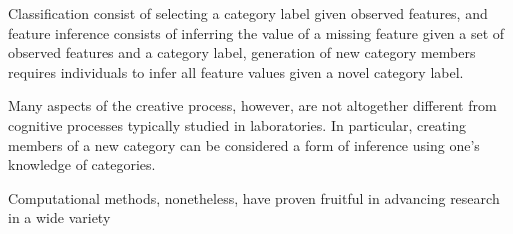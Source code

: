 \documentclass[12pt]{article}
\begin{document}
\begin{flushleft}
Classification consist of selecting a category label given observed features, and feature inference consists of inferring the value of a missing feature given a set of observed features and a category label, generation of new category members requires individuals to infer all feature values given a novel category label.


Many aspects of the creative process, however, are not altogether different from cognitive processes typically studied in laboratories. In particular, creating members of a new category can be considered a form of inference using one's knowledge of categories.



Computational methods, nonetheless, have proven fruitful in advancing research in a wide variety














\end{flushleft}
\end{document}
